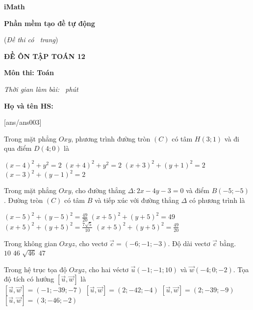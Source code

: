 \documentclass[12pt,a4paper]{article}
\newcommand{\tenso}{iMath}
\newcommand{\tentruong}{Phần mềm tạo đề tự động}
\newcommand{\tenkythi}{ĐỀ ÔN TẬP TOÁN 12}
\newcommand{\tenmonthi}{Môn thi: Toán}
\newcommand{\thoigian}{}
\newcommand{\tieude}[2]{
    \noindent
    \begin{minipage}[b]{7cm}
        \centerline{\textbf{\fontsize{13}{0}\selectfont \tenso}}
        \centerline{\textbf{\fontsize{13}{0}\selectfont \tentruong}}
        \centerline{(\textit{Đề thi có #1\ trang})}
    \end{minipage}\hspace{1.5cm}
    \begin{minipage}[b]{9cm}
        \centerline{\textbf{\fontsize{13}{0}\selectfont \tenkythi}}
        \centerline{\textbf{\fontsize{13}{0}\selectfont \tenmonthi}}
        \centerline{\textit{\fontsize{12}{0}\selectfont Thời gian làm bài: \thoigian\ phút}}
    \end{minipage}
    \begin{minipage}[b]{10cm}
        \textbf{Họ và tên HS: }{\tiny\dotfill}
    \end{minipage}
    \begin{minipage}[b]{8cm}
        \hspace*{4cm}\fbox{\bf Mã đề: #2}
    \end{minipage}\vspace{3pt}
}
\newcommand{\chantrang}[2]{\rfoot{Trang \thepage $-$ Mã đề #2}}
\begin{document}


\tieude{\pageref{LastPage}}{003}

\chantrang{\pageref{LastPage}}{003}

\setcounter{page}{1}

\setcounter{ex}{0}
[ans/ans003]
\begin{ex}
 Trong mặt phẳng ${Oxy}$, phương trình đường tròn ${(C)}$ có tâm ${H(3;1)}$ và đi qua điểm $D(4;0)$ là
 
\choice
{ $\left(x - 4\right)^{2}+y^{2}=2$ }
   { $\left(x + 4\right)^{2}+y^{2}=2$ }
     { $\left(x + 3\right)^{2}+\left(y + 1\right)^{2}=2$ }
    { \True $\left(x - 3\right)^{2}+\left(y - 1\right)^{2}=2$ }
\end{ex}

\begin{ex}
 Trong mặt phẳng ${Oxy}$, cho đường thẳng $\Delta: 2 x - 4 y - 3=0$ và điểm ${B(-5;-5)}$. Đường tròn ${(C)}$ có tâm ${B}$ và tiếp xúc với đường thẳng $\Delta$ có phương trình là
 
\choice
{ $\left(x - 5\right)^{2}+\left(y - 5\right)^{2}=\frac{49}{20}$ }
   { $\left(x + 5\right)^{2}+\left(y + 5\right)^{2}=49$ }
     { $\left(x + 5\right)^{2}+\left(y + 5\right)^{2}=\frac{7 \sqrt{5}}{10}$ }
    { \True $\left(x + 5\right)^{2}+\left(y + 5\right)^{2}=\frac{49}{20}$ }
\end{ex}

\begin{ex}
 Trong không gian ${Oxyz}$, cho vectơ $\overrightarrow{c}=(-6;-1;-3)$. Độ dài vectơ $\overrightarrow{c}$ bằng.\\ 
\choice
{ ${10}$ }
   { ${46}$ }
     { \True ${\sqrt{46}}$ }
    { ${47}$ }
\end{ex}

\begin{ex}
 Trong hệ trục tọa độ ${Oxyz}$, cho hai véctơ $\overrightarrow{u}(-1;-1;10)$ và $\overrightarrow{w}(-4;0;-2)$. Tọa độ tích có hướng $\left[\overrightarrow{u},\overrightarrow{w}\right]$ là\\ 
\choice
{ $\left[\overrightarrow{u},\overrightarrow{w}\right]=(-1;-39;-7)$ }
   { \True $\left[\overrightarrow{u},\overrightarrow{w}\right]= (2;-42;-4)$ }
     { $\left[\overrightarrow{u},\overrightarrow{w}\right]=(2;-39;-9)$ }
    { $\left[\overrightarrow{u},\overrightarrow{w}\right]=(3;-46;-2)$ }
\end{ex}
\end{document}
